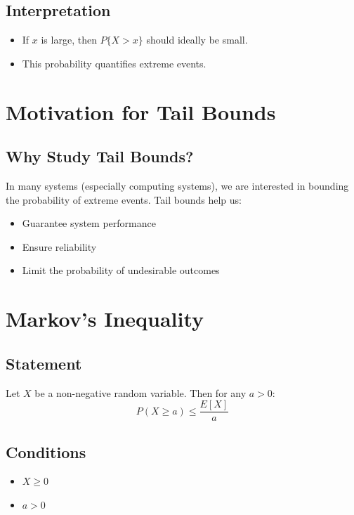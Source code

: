 \documentclass[11pt]{article}
\begin{document}
\subsection*{Interpretation}
\begin{itemize}
    \item If $x$ is large, then $P\{X > x\}$ should ideally be small.
    \item This probability quantifies extreme events.
\end{itemize}

\section{Motivation for Tail Bounds}

\subsection{Why Study Tail Bounds?}

In many systems (especially computing systems), we are interested in bounding the probability of extreme events. Tail bounds help us:
\begin{itemize}
    \item Guarantee system performance
    \item Ensure reliability
    \item Limit the probability of undesirable outcomes
\end{itemize}

\section{Markov’s Inequality}

\subsection{Statement}

Let $X$ be a non-negative random variable. Then for any $a > 0$:
\[
P(X \geq a) \leq \frac{E[X]}{a}
\]

\subsection{Conditions}
\begin{itemize}
    \item $X \geq 0$
    \item $a > 0$
\end{itemize}
\end{document}
